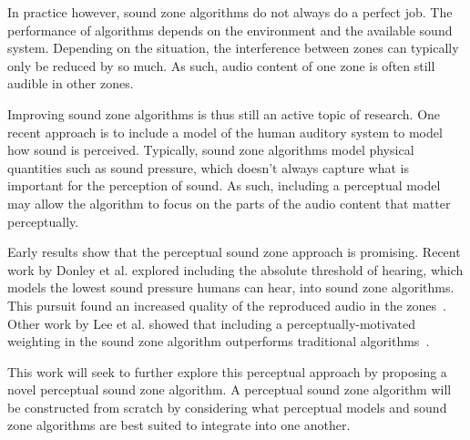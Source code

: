 In practice however, sound zone algorithms do not always do a perfect job.
The performance of algorithms depends on the environment and the available sound system.
Depending on the situation, the interference between zones can typically only be reduced by so much.
As such, audio content of one zone is often still audible in other zones.

Improving sound zone algorithms is thus still an active topic of research.
One recent approach is to include a model of the human auditory system to model how sound is perceived.
Typically, sound zone algorithms model physical quantities such as sound pressure, which doesn't always capture
what is important for the perception of sound.
As such, including a perceptual model may allow the algorithm to focus on the parts of the audio content
that matter perceptually.

Early results show that the perceptual sound zone approach is promising.
Recent work by Donley et al. explored including the absolute threshold of hearing, which models the lowest sound pressure
humans can hear, into sound zone algorithms.
This pursuit found an increased quality of the reproduced audio in the zones~\cite{donley2015multizone}.
Other work by Lee et al. showed that including a perceptually-motivated weighting in the sound zone algorithm outperforms 
traditional algorithms~\cite{lee2019towards,lee2020signal}.

This work will seek to further explore this perceptual approach by proposing a novel perceptual sound zone algorithm.
A perceptual sound zone algorithm will be constructed from scratch by considering what perceptual models and sound
zone algorithms are best suited to integrate into one another.
